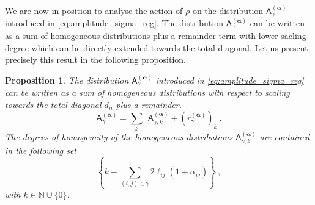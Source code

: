 \documentclass[11pt]{book}
\newcommand{\alphabd}{\boldsymbol{\alpha}}
\newcommand{\Asf}{\mathsf{A}}
\theoremstyle{break}
\newtheorem{proposition}{Proposition}[chapter]
\begin{document}
We are now in position to analyse the action of $\rho$ on the distribution $\Asf_\gamma^{(\alphabd)}$ introduced in \eqref{eq:amplitude_sigma_reg}. The distribution $\Asf_\gamma^{(\alphabd)}$ can be written as a sum of homogeneous distributions plus a remainder term with lower sacling degree which can be directly extended towards the total diagonal. Let us present precisely this result in the following proposition.


\begin{proposition}\label{prop:almost_homo}
The distribution $\Asf_\gamma^{(\alphabd)}$ introduced in \eqref{eq:amplitude_sigma_reg} can be written as a sum of homogeneous distributions with respect to scaling towards the total diagonal $d_n$ plus a remainder.
%
\begin{equation*}
\Asf_\gamma^{(\alphabd)} = \sum_k \ \ \Asf_{\gamma,k}^{(\alphabd)} + \left(r_\gamma^{(\alphabd)}\right)_k \ .
\end{equation*}
%
The degrees of homogeneity of the homogeneous distributions $\Asf_{\gamma,k}^{(\alphabd)}$ are contained in the following set
%
\begin{equation*}
\left\{k-\sum_{(i,j)\in\gamma} 2 \ell_{ij}(1+ \alpha_{ij}) \right\} \ ,
\end{equation*}
%
with $k\in \mathbb{N}\cup \{0\}$.
\end{proposition}
\end{document}
